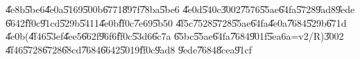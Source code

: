 \documentclass{article}
\begin{document}
\U{4e8b}\U{5be6}\U{4e0a}\U{5169}\U{500b}\U{6771}\U{897f}\U{78ba}\U{5be6}%
\U{4e0d}\U{540c}\U{3002}\U{7576}\U{55ae}\U{64fa}\U{5728}\U{9ad8}\U{9ede}%
\U{6642}\U{ff0c}\U{91cd}\U{529b}\U{5411}\U{4e0b}\U{ff0c}\U{7e69}\U{5b50}%
\U{4f5c}\U{7528}\U{5728}\U{55ae}\U{64fa}\U{4e0a}\U{7684}\U{529b}\U{671d}%
\U{4e0b}(\U{4f46}\U{53ef}\U{4ee5}\U{662f}\U{96f6}\U{ff0c}\U{53d6}\U{6c7a}%
\U{65bc}\U{55ae}\U{64fa}\U{7684}\U{901f}\U{5ea6}a=v2/R)\U{3002}%
\U{4f46}\U{5728}\U{6728}\U{68cd}\U{7684}\U{6642}\U{5019}\U{ff0c}\U{9ad8}%
\U{9ede}\U{7684}\U{8cea}\U{91cf}
\end{document}

